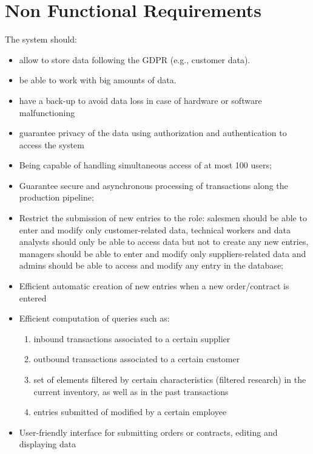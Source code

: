 \section{Non Functional Requirements}
The system should:
\begin{itemize}
    \item allow to store data following the GDPR (e.g., customer data).
    \item be able to work with big amounts of data.
    \item have a back-up to avoid data loss in case of hardware or software malfunctioning
    \item guarantee privacy of the data using authorization and authentication to access the system
    \item Being capable of handling simultaneous access of at most 100 users;
    \item Guarantee secure and asynchronous processing of transactions along the production pipeline;
    \item Restrict the submission of new entries to the role: salesmen should be able to enter and modify only customer-related data, technical workers and data analysts should only be able to access data but not to create any new entries, managers should be able to enter and modify only suppliers-related data and admins should be able to access and modify any entry in the database;
    \item Efficient automatic creation of new entries when a new order/contract is entered 
    \item Efficient computation of queries such as:
    \begin{enumerate}
    \item inbound transactions associated to a certain supplier
    \item outbound transactions associated to a certain customer
   \item set of elements filtered by certain characteristics (filtered research) in the current inventory, as well as in the past transactions
   \item entries submitted of modified by a certain employee
    \end{enumerate}
    \item User-friendly interface for submitting orders or contracts, editing and displaying data
\end{itemize}

